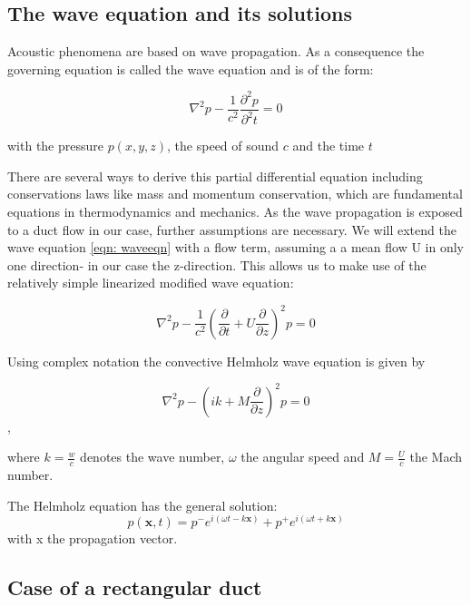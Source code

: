 \documentclass[11pt]{report} %
\begin{document}
\subsection{The wave equation and its solutions}
Acoustic phenomena are based on wave propagation. As a consequence the governing equation is called the wave equation and is of the form: 

\begin{equation}
    \nabla^2p-\frac{1}{c^2}\frac{\partial^2p}{\partial^2t}  = 0 \label{eqn: waveeqn}
 \end{equation} 
 
with the pressure $p(x,y,z)$, the speed of sound $c$ and the time $t$

There are several ways to derive this partial differential equation including conservations laws like mass and momentum conservation, which are fundamental equations in thermodynamics and mechanics.
As the wave propagation is exposed to a duct flow in our case, further assumptions are necessary.
We will extend the wave equation \eqref{eqn: waveeqn} with a flow term, assuming a a mean flow U in only one direction- in our case the z-direction.
This allows us to make use of the relatively simple linearized modified wave equation: 

\begin{equation}
    \nabla ^2p-\frac{1}{c^2} \left( \frac{\partial}{\partial t}+U\frac{\partial}{\partial z} \right)^2p  = 0
\end{equation}   

Using complex notation the convective Helmholz wave equation is given by 

\begin{equation}
\nabla^2 p - \left(ik +M\frac{\partial}{\partial z}\right)^2p = 0
\end{equation},  

where $k=\frac{w}{c}$ denotes the wave number, $\omega$ the angular speed and $M=\frac{U}{c}$ the Mach number. 

The Helmholz equation has the general solution:
\begin{equation}
p(\textbf{x},t)=p^{-}e^{i(\omega t-k\textbf{x})}+p^{+}e^{i(\omega t+k\textbf{x})}
\end{equation}
with x the propagation vector. 

\subsection{Case of a rectangular duct}
\end{document}
